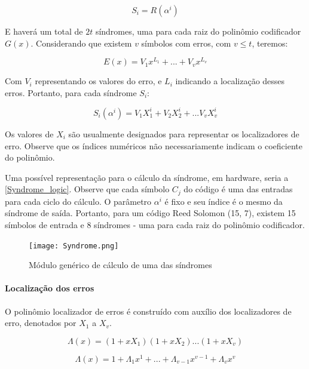	\begin{equation}
	S_{i} = R(\alpha^{i})
	\end{equation}
	
	E haverá um total de $2t$ síndromes, uma para cada raiz do polinômio codificador $G(x)$. Considerando que existem $v$ símbolos com erros, com $v \leq t$, teremos:
	
	\begin{equation}
	E(x) = V_{1}x^{L_{1}} + ... + V_{v}x^{L_{v}}
	\end{equation}
	
	Com $V_{i}$ representando os valores do erro, e $L_{i}$ indicando a localização desses erros. Portanto, para cada síndrome $S_{i}$:
	
	\begin{equation}
	S_{i}(\alpha^{i}) = V_{1}X_{1}^{i} + V_{2}X_{2}^{i} + ... V_{v}X_{v}^{i}
	\end{equation}
	
	Os valores de $X_{i}$ são usualmente designados para representar os localizadores de erro. Observe que os índices numéricos não necessariamente indicam o coeficiente do polinômio.
	
	Uma possível representação para o cálculo da síndrome, em hardware, seria a \autoref{Syndrome_logic}. Observe que cada símbolo $C_{j}$ do código é uma das entradas para cada ciclo do cálculo. O parâmetro $\alpha^{i}$ é fixo e seu índice é o mesmo da síndrome de saída. Portanto, para um código Reed Solomon (15, 7), existem 15 símbolos de entrada e 8 síndromes - uma para cada raiz do polinômio codificador.
	
	\begin{figure}[htb]
		\caption{\label{Syndrome_logic} Módulo genérico de cálculo de uma das síndromes}
		\centering
		\texttt{[image: Syndrome.png]}
	\end{figure}
	
	\paragraph{Localização dos erros}
	
	O polinômio localizador de erros é construído com auxílio dos localizadores de erro, denotados por $X_{1}$ a $X_{v}$.
	
	\begin{equation}
	\Lambda(x) = (1 + xX_{1})(1 + xX_{2})...(1 + xX_{v})
	\end{equation}
	
	\begin{equation}
	\Lambda(x) =  1 + \Lambda_{1}x^{1} + ... + \Lambda_{v-1}x^{v-1} + \Lambda_{v}x^{v}
	\end{equation}
	
